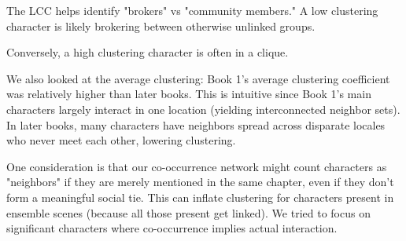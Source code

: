 \documentclass[12pt, a4paper]{article}
\begin{document}
The LCC helps identify "brokers" vs "community members." A low clustering character is likely brokering between otherwise unlinked groups.

Conversely, a high clustering character is often in a clique. 

We also looked at the average clustering: Book 1's average clustering coefficient was relatively higher than later books. This is intuitive since Book 1's main characters largely interact in one location (yielding interconnected neighbor sets). In later books, many characters have neighbors spread across disparate locales who never meet each other, lowering clustering. 

One  consideration is that our co-occurrence network might count characters as "neighbors" if they are merely mentioned in the same chapter, even if they don't form a meaningful social tie. This can inflate clustering for characters present in ensemble scenes (because all those present get linked). We tried to focus on significant characters where co-occurrence implies actual interaction.
\end{document}
